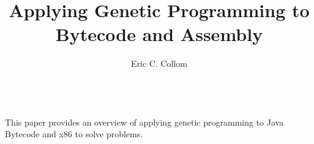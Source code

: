 \documentclass{sig-alternate}
\begin{document}
%

\title{Applying Genetic Programming to Bytecode and Assembly}
%
%
%
%
%
%
\author{
%
%
\alignauthor
Eric C. Collom \\
 \\
}

\maketitle
\begin{abstract}

\end{abstract}
This paper provides an overview of applying genetic programming to Java Bytecode and x86 to solve problems.
\end{document}
